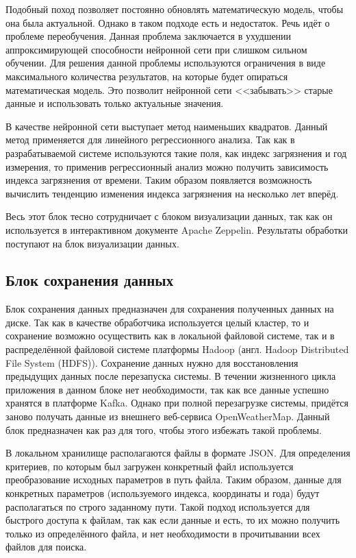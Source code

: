 Подобный поход позволяет постоянно обновлять математическую модель, чтобы она была актуальной.
Однако в таком подходе есть и недостаток.
Речь идёт о проблеме переобучения.
Данная проблема заключается в ухудшении аппроксимирующей способности нейронной сети при слишком сильном обучении.
Для решения данной проблемы используются ограничения в виде максимального количества результатов, на которые будет опираться математическая модель.
Это позволит нейронной сети <<забывать>> старые данные и использовать только актуальные значения.

В качестве нейронной сети выступает метод наименьших квадратов.
Данный метод применяется для линейного регрессионного анализа.
Так как в разрабатываемой системе используются такие поля, как индекс загрязнения и год измерения, то применив регрессионный анализ можно получить зависимость индекса загрязнения от времени.
Таким образом появляется возможность вычислить тенденцию изменения индекса загрязнения на несколько лет вперёд.


Весь этот блок тесно сотрудничает с блоком визуализации данных, так как он используется в интерактивном документе Apache Zeppelin.
Результаты обработки поступают на блок визуализации данных.

\subsection{Блок сохранения данных}

Блок сохранения данных предназначен для сохранения полученных данных на диске.
Так как в качестве обработчика используется целый кластер, то и сохранение возможно осуществить как в локальной файловой системе, так и в распределённой файловой системе платформы Hadoop (англ. Hadoop Distributed File System (HDFS)).
Сохранение данных нужно для восстановления предыдущих данных после перезапуска системы.
В течении жизненного цикла приложения в данном блоке нет необходимости, так как все данные успешно хранятся в платформе Kafka.
Однако при полной перезагрузке системы, придётся заново получать данные из внешнего веб-сервиса OpenWeatherMap. 
Данный блок предназначен как раз для того, чтобы этого избежать такой проблемы.

В локальном хранилище располагаются файлы в формате JSON.
Для определения критериев, по которым был загружен конкретный файл используется преобразование исходных параметров в путь файла.
Таким образом, данные для конкретных параметров (используемого индекса, координаты и года) будут располагаться по строго заданному пути.
Такой подход используется для быстрого доступа к файлам, так как если данные и есть, то их можно получить только из определённого файла, и нет необходимости в прочитывании всех файлов для поиска.

